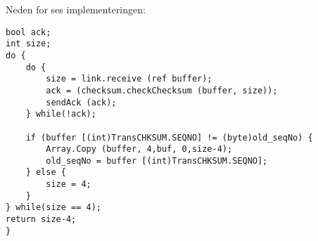 \noindent Neden for ses implementeringen:
\begin{lstlisting}
bool ack;
int size;
do {
	do {
		size = link.receive (ref buffer);
		ack = (checksum.checkChecksum (buffer, size));
		sendAck (ack);
	} while(!ack);

	if (buffer [(int)TransCHKSUM.SEQNO] != (byte)old_seqNo) {
		Array.Copy (buffer, 4,buf, 0,size-4);
		old_seqNo = buffer [(int)TransCHKSUM.SEQNO];
	} else {
		size = 4;
	}
} while(size == 4);
return size-4;
}
\end{lstlisting}